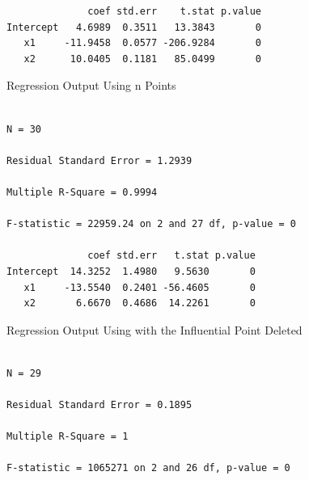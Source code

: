 {{{\begin{verbatim}
              coef std.err    t.stat p.value 
Intercept   4.6989  0.3511   13.3843       0
   x1     -11.9458  0.0577 -206.9284       0
   x2      10.0405  0.1181   85.0499       0
\end{verbatim}
}
\begin{figure}
\end{figure}
\begin{figure}
\end{figure}
\begin{figure}
\end{figure}
\begin{figure}
\end{figure}
\begin{figure}
\end{figure}
\begin{figure}
\end{figure}
\clearpage
\newpage
\begin{center}
Regression Output Using n Points
\end{center}
{\large
\begin{verbatim}

N = 30

Residual Standard Error = 1.2939

Multiple R-Square = 0.9994

F-statistic = 22959.24 on 2 and 27 df, p-value = 0

              coef std.err   t.stat p.value 
Intercept  14.3252  1.4980   9.5630       0
   x1     -13.5540  0.2401 -56.4605       0
   x2       6.6670  0.4686  14.2261       0
\end{verbatim}
}
\vspace{0.5in}
\begin{center}
Regression Output Using with the Influential Point Deleted
\end{center}
{\large
\begin{verbatim}

N = 29

Residual Standard Error = 0.1895

Multiple R-Square = 1

F-statistic = 1065271 on 2 and 26 df, p-value = 0


\end{verbatim}}}}
